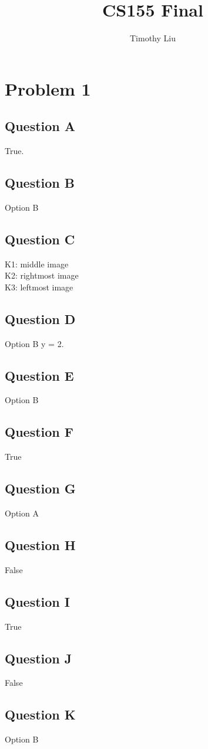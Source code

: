 \documentclass[12pt]{article} %
\title{CS155 Final}
\author{Timothy Liu}
\begin{document}
\maketitle

\section{Problem 1}
\subsection{Question A}
True.
\subsection{Question B}
Option B
\subsection{Question C}
K1: middle image\\
K2: rightmost image\\
K3: leftmost image
\subsection{Question D}
Option B y = 2.
\subsection{Question E}
Option B
\subsection{Question F}
True
\subsection{Question G}
Option A
\subsection{Question H}
False
\subsection{Question I}
True
\subsection{Question J}
False
\subsection{Question K}
Option B
\end{document}
